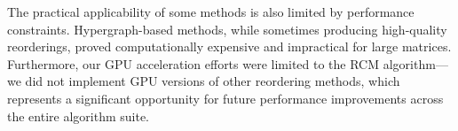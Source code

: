 The practical applicability of some methods is also limited by performance constraints. Hypergraph-based methods, while sometimes producing high-quality reorderings, proved computationally expensive and impractical for large matrices. Furthermore, our GPU acceleration efforts were limited to the RCM algorithm—we did not implement GPU versions of other reordering methods, which represents a significant opportunity for future performance improvements across the entire algorithm suite.


